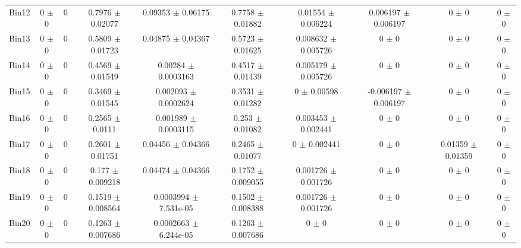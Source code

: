 \begin{tabular}{@{\extracolsep{4pt}}lccccccccc@{}}
     Bin12 & 0 $\pm$ 0 & 0 & 0.7976 $\pm$ 0.02077 & 0.09353 $\pm$ 0.06175 & 0.7758 $\pm$ 0.01882 & 0.01554 $\pm$ 0.006224 & 0.006197 $\pm$ 0.006197 & 0 $\pm$ 0 & 0 $\pm$ 0 \\ 
     Bin13 & 0 $\pm$ 0 & 0 & 0.5809 $\pm$ 0.01723 & 0.04875 $\pm$ 0.04367 & 0.5723 $\pm$ 0.01625 & 0.008632 $\pm$ 0.005726 & 0 $\pm$ 0 & 0 $\pm$ 0 & 0 $\pm$ 0 \\ 
     Bin14 & 0 $\pm$ 0 & 0 & 0.4569 $\pm$ 0.01549 & 0.00284 $\pm$ 0.0003163 & 0.4517 $\pm$ 0.01439 & 0.005179 $\pm$ 0.005726 & 0 $\pm$ 0 & 0 $\pm$ 0 & 0 $\pm$ 0 \\ 
     Bin15 & 0 $\pm$ 0 & 0 & 0.3469 $\pm$ 0.01545 & 0.002093 $\pm$ 0.0002624 & 0.3531 $\pm$ 0.01282 & 0 $\pm$ 0.00598 & -0.006197 $\pm$ 0.006197 & 0 $\pm$ 0 & 0 $\pm$ 0 \\ 
     Bin16 & 0 $\pm$ 0 & 0 & 0.2565 $\pm$ 0.0111 & 0.001989 $\pm$ 0.0003115 & 0.253 $\pm$ 0.01082 & 0.003453 $\pm$ 0.002441 & 0 $\pm$ 0 & 0 $\pm$ 0 & 0 $\pm$ 0 \\ 
     Bin17 & 0 $\pm$ 0 & 0 & 0.2601 $\pm$ 0.01751 & 0.04456 $\pm$ 0.04366 & 0.2465 $\pm$ 0.01077 & 0 $\pm$ 0.002441 & 0 $\pm$ 0 & 0.01359 $\pm$ 0.01359 & 0 $\pm$ 0 \\ 
     Bin18 & 0 $\pm$ 0 & 0 & 0.177 $\pm$ 0.009218 & 0.04474 $\pm$ 0.04366 & 0.1752 $\pm$ 0.009055 & 0.001726 $\pm$ 0.001726 & 0 $\pm$ 0 & 0 $\pm$ 0 & 0 $\pm$ 0 \\ 
     Bin19 & 0 $\pm$ 0 & 0 & 0.1519 $\pm$ 0.008564 & 0.0003994 $\pm$ 7.531e-05 & 0.1502 $\pm$ 0.008388 & 0.001726 $\pm$ 0.001726 & 0 $\pm$ 0 & 0 $\pm$ 0 & 0 $\pm$ 0 \\ 
     Bin20 & 0 $\pm$ 0 & 0 & 0.1263 $\pm$ 0.007686 & 0.0002663 $\pm$ 6.244e-05 & 0.1263 $\pm$ 0.007686 & 0 $\pm$ 0 & 0 $\pm$ 0 & 0 $\pm$ 0 & 0 $\pm$ 0 \\ 
\hline\hline
  \end{tabular}
